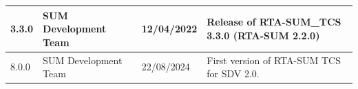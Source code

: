 \begin{longtable}{|l|l|l|l|}
\begin{minipage}{0.14\linewidth}\raggedright\vspace{.75ex}3.3.0\vspace{.75ex}\end{minipage} & \begin{minipage}{0.19\linewidth}\raggedright\vspace{.75ex}SUM Development Team\vspace{.75ex}\end{minipage} & \begin{minipage}{0.12\linewidth}\raggedright\vspace{.75ex}12/04/2022\vspace{.75ex}\end{minipage} & \begin{minipage}{0.43\linewidth}\raggedright\vspace{.75ex}Release of RTA-SUM_TCS 3.3.0 (RTA-SUM 2.2.0)\vspace{.75ex}\end{minipage}\\\hline
\begin{minipage}{0.14\linewidth}\raggedright\vspace{.75ex}8.0.0\vspace{.75ex}\end{minipage} & \begin{minipage}{0.19\linewidth}\raggedright\vspace{.75ex}SUM Development Team\vspace{.75ex}\end{minipage} & \begin{minipage}{0.12\linewidth}\raggedright\vspace{.75ex}22/08/2024\vspace{.75ex}\end{minipage} & \begin{minipage}{0.43\linewidth}\raggedright\vspace{.75ex}First version of RTA-SUM TCS for SDV 2.0.\vspace{.75ex}\end{minipage}\\\hline

\end{longtable}
